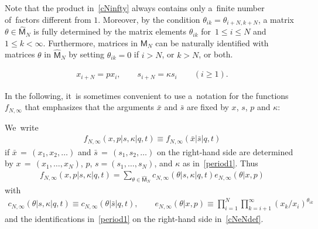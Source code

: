 \documentclass[11pt]{article}
\numberwithin{equation}{section}
\newcommand{\bx}{\bar{x}}
\newcommand{\bs}{\bar{s}}
\begin{document}
Note that the product in~\eqref{cNinfty} always contains only a~finite number of~factors different from $1$. Moreover, by the condition $\theta_{ik}=\theta_{i+N,k+N}$,
a matrix $\theta\in\hat{\mathsf{M}}_N$ is fully determined by the matrix elements $\theta_{ik}$ for~$1\leq i\leq N$ and $1\leq k<\infty$.
Furthermore, matrices in $\mathsf{M}_N$ can be naturally identified with matrices $\theta$ in $\hat{\mathsf{M}}_N$ by setting $\theta_{ik}=0$ if $i>N$, or $k>N$, or both.

\setcounter{section}{3}
\setcounter{subsection}{1}
\setcounter{subsubsection}{0}
\setcounter{Theorem}{2}
\setcounter{equation}{4}
\begin{gather}
\label{period1}
x_{i+N}=px_i,\qquad s_{i+N}=\kappa s_i \qquad (i\geq 1).
\end{gather}

\setcounter{section}{3}
\setcounter{subsection}{1}
\setcounter{subsubsection}{0}
\setcounter{Theorem}{2}
\setcounter{equation}{5}
In the following, it~is sometimes convenient to use a~notation for the functions $f_{N,\infty}$ that emphasizes that the arguments $\bx$ and $\bs$ are fixed by $x$, $s$, $p$ and $\kappa$:

\begin{Definition}
\label{def:fNinfty}
We~write
\begin{gather*}
f_{N,\infty}(x,p|s,\kappa|q,t) \equiv f_{N,\infty}(\bx|\bs|q,t)
\end{gather*}
if $\bx\,{=}\,(x_1,x_2,\dots)$ and $\bs\,{=}\,(s_1,s_2,\dots)$ on the right-hand side are determined by $x\,{=}\,(x_1,\dots,x_N)$, $p$, $s=(s_1,\dots,s_N)$, and $\kappa$ as in~\eqref{period1}.
Thus
\begin{gather*}
f_{N,\infty}(x,p|s,\kappa|q,t) = \sum_{\theta\in\hat{\mathsf{M}}_N} c_{N,\infty}(\theta|s,\kappa|q,t)e_{N,\infty}(\theta|x,p)
\end{gather*}
with
\begin{gather}\label{cNeNdef}
c_{N,\infty}(\theta|s,\kappa|q,t) \equiv c_{N,\infty}(\theta|\bs|q,t),
\qquad
e_{N,\infty}(\theta|x,p)\equiv \prod_{i=1}^N \prod_{k=i+1}^\infty (x_k/x_i)^{\theta_{ik}}
\end{gather}
and the identifications in~\eqref{period1} on the right-hand side in~\eqref{cNeNdef}.
\end{Definition}
\end{document}
